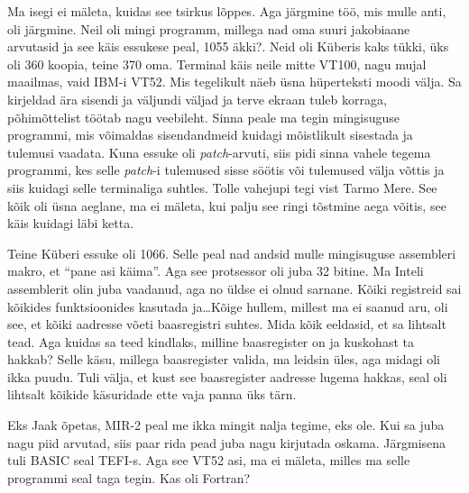 Ma isegi ei  mäleta, kuidas see tsirkus lõppes. Aga järgmine töö, mis mulle 
anti, oli järgmine. Neil oli mingi programm, millega nad oma suuri jakobiaane 
arvutasid ja  see käis essukese peal, 1055 äkki?. Neid 
oli Küberis kaks tükki, üks oli 360 koopia, teine 370 oma. Terminal käis neile 
mitte VT100, nagu mujal maailmas, vaid IBM-i VT52. Mis tegelikult näeb  üsna 
hüperteksti moodi välja. Sa kirjeldad ära sisendi  ja väljundi väljad ja terve 
ekraan tuleb korraga, põhimõttelist töötab nagu veebileht. Sinna peale 
ma tegin mingisuguse programmi, mis võimaldas sisendandmeid kuidagi mõistlikult 
 sisestada ja tulemusi vaadata. Kuna essuke oli \emph{patch}-arvuti, siis pidi 
sinna vahele tegema programmi, kes selle \emph{patch}-i tulemused 
sisse söötis või tulemused välja võttis ja siis kuidagi  selle 
terminaliga suhtles. Tolle vahejupi tegi vist Tarmo Mere. See kõik oli üsna aeglane, ma ei mäleta, kui palju see ringi tõstmine 
aega võitis, see käis kuidagi läbi ketta.

Teine Küberi essuke oli 1066. Selle peal nad andsid mulle mingisuguse 
assembleri makro, et \enquote{pane asi käima}. Aga see protsessor oli juba 32 
bitine. Ma Inteli assemblerit olin juba vaadanud, aga no üldse ei olnud 
sarnane. Kõiki registreid sai kõikides funktsioonides kasutada ja\ldots Kõige 
hullem, millest ma ei saanud aru, oli see, et kõiki aadresse võeti 
baasregistri suhtes. Mida kõik eeldasid, et sa lihtsalt 
tead.  Aga kuidas sa teed kindlaks, milline baasregister on ja kuskohast ta 
hakkab? Selle käsu, millega baasregister valida, ma leidsin üles, aga 
midagi oli ikka puudu. Tuli välja, et kust see baasregister  aadresse 
lugema hakkas, seal oli lihtsalt kõikide käsuridade ette vaja panna üks 
tärn.
                 

Eks Jaak õpetas, MIR-2 peal me ikka mingit nalja tegime, 
eks ole. Kui sa juba nagu piid arvutad, siis paar rida pead juba nagu kirjutada 
oskama. Järgmisena tuli BASIC seal TEFI-s. Aga see VT52 asi, ma ei mäleta, 
milles ma selle programmi seal taga tegin. Kas oli Fortran? 



